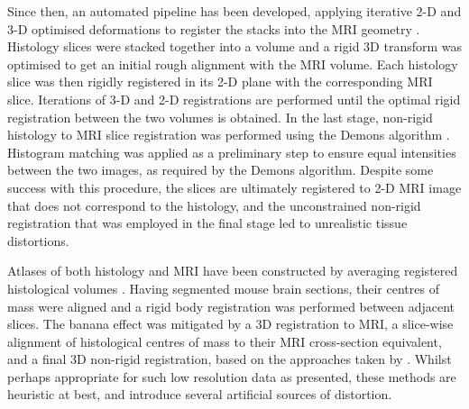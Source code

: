   Since then, an automated pipeline has been developed, applying iterative 2-D and 3-D optimised deformations to register the stacks into the MRI geometry \cite{Mansoori2007}. Histology slices were stacked together into a volume and a rigid 3D transform was optimised to get an initial rough alignment with the MRI volume. Each histology slice was then rigidly registered in its 2-D plane with the corresponding MRI slice. Iterations of 3-D and 2-D registrations are performed until the optimal rigid registration between the two volumes is obtained. In the last stage, non-rigid histology to MRI slice registration was performed using the Demons algorithm \cite{Thirion1995}. Histogram matching was applied as a preliminary step to ensure equal intensities between the two images, as required by the Demons algorithm. Despite some success with this procedure, the slices are ultimately registered to 2-D MRI image that does not correspond to the histology, and the unconstrained non-rigid registration that was employed in the final stage led to unrealistic tissue distortions.
  
  Atlases of both histology and MRI have been constructed by averaging registered histological volumes \cite{Li2009}. Having segmented mouse brain sections, their centres of mass were aligned and a rigid body registration was performed between adjacent slices. The banana effect was mitigated by a 3D registration to MRI, a slice-wise alignment of histological centres of mass to their MRI cross-section equivalent, and a final 3D non-rigid registration, based on the approaches taken by \cite{Yushkevich2006,Malandain2004}. Whilst perhaps appropriate for such low resolution data as presented, these methods are heuristic at best, and introduce several artificial sources of distortion.
  
